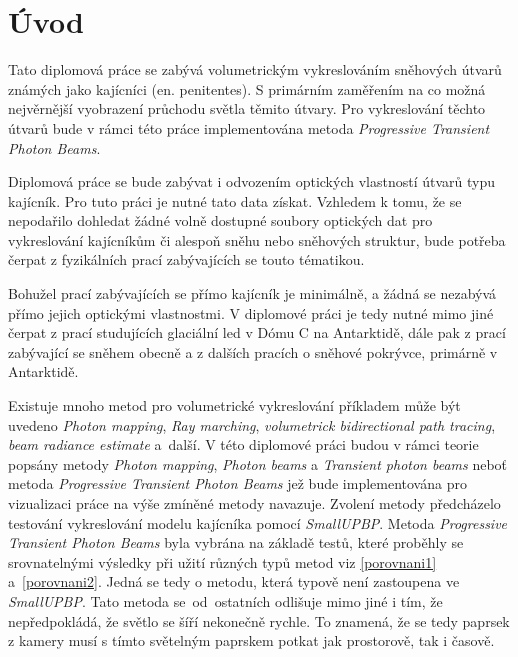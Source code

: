 

\chapter{Úvod}
\label{uvod}
Tato diplomová práce se zabývá volumetrickým vykreslováním sněhových útvarů známých jako kajícníci (en. penitentes). S primárním zaměřením na co možná nejvěrnější vyobrazení průchodu světla těmito útvary. Pro vykreslování těchto útvarů bude v rámci této práce implementována metoda \textit{Progressive Transient Photon Beams}\cite{ptpb}.

Diplomová práce se bude zabývat i odvozením optických vlastností útvarů typu kajícník. Pro tuto práci je nutné tato data získat. Vzhledem k tomu, že se nepodařilo  dohledat žádné volně dostupné soubory optických dat pro vykreslování kajícníkům  či alespoň sněhu nebo sněhových struktur, bude potřeba čerpat z fyzikálních prací zabývajících se touto tématikou. 

Bohužel prací zabývajících se přímo kajícník je minimálně, a žádná se nezabývá přímo jejich optickými vlastnostmi. V diplomové práci je tedy nutné mimo jiné čerpat z prací studujících glaciální led v Dómu C na Antarktidě\cite{refinement_ice}\cite{snow_properties}, dále pak z prací zabývající se sněhem obecně\cite{soos} a z dalších pracích o sněhové pokrývce, primárně v Antarktidě.

Existuje mnoho metod pro volumetrické vykreslování příkladem může být uvedeno \textit{Photon mapping}, \textit{Ray marching}, \textit{volumetrick bidirectional path tracing}, \textit{beam radiance estimate} a~další. V  této diplomové práci budou v rámci teorie popsány metody \textit{Photon mapping}, \textit{Photon beams} a \textit{Transient photon beams} neboť metoda \textit{Progressive Transient Photon Beams} jež bude implementována pro vizualizaci práce na výše zmíněné metody navazuje. Zvolení metody předcházelo testování vykreslování modelu kajícníka pomocí \textit{SmallUPBP}\cite{smallubpb}.  Metoda \textit{Progressive Transient Photon Beams} byla vybrána na základě testů, které proběhly se srovnatelnými výsledky při užití různých typů metod viz \ref{porovnani1} a~\ref{porovnani2}. Jedná se tedy o metodu, která typově není zastoupena ve \textit{SmallUPBP}. Tato metoda se~od~ostatních odlišuje mimo jiné i tím, že nepředpokládá, že světlo se šíří nekonečně rychle. To znamená, že se tedy paprsek z kamery musí s tímto světelným paprskem potkat jak prostorově, tak i časově.

